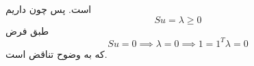 \begin{enumerate}
است.
پس چون داریم
\[
Su = \lambda \ge 0
\]
طبق فرض
\[
Su = 0 \implies \lambda = 0 \implies 1 = 1^T\lambda = 0 
\]
که به وضوح تناقض است.
\end{enumerate}